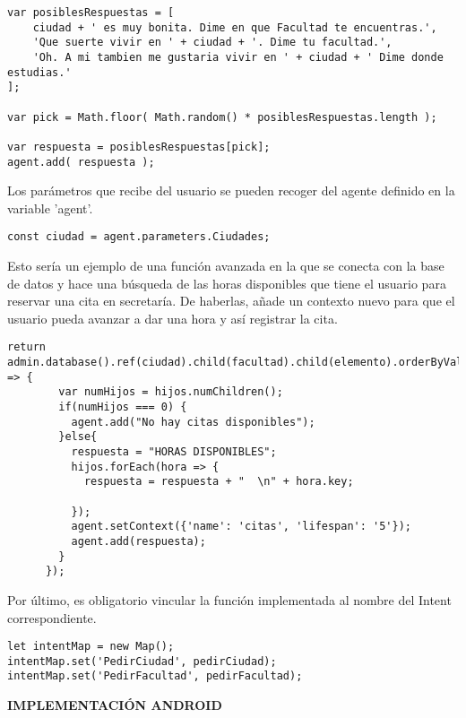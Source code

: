 \documentclass[11pt,a4paper]{article}
\begin{document}
\begin{lstlisting}
var posiblesRespuestas = [
    ciudad + ' es muy bonita. Dime en que Facultad te encuentras.',
    'Que suerte vivir en ' + ciudad + '. Dime tu facultad.',
    'Oh. A mi tambien me gustaria vivir en ' + ciudad + ' Dime donde estudias.'
];

var pick = Math.floor( Math.random() * posiblesRespuestas.length );

var respuesta = posiblesRespuestas[pick];
agent.add( respuesta );
\end{lstlisting}

Los parámetros que recibe del usuario se pueden recoger del agente definido en la variable 'agent'.\\

\begin{lstlisting}
const ciudad = agent.parameters.Ciudades;
\end{lstlisting}

Esto sería un ejemplo de una función avanzada en la que se conecta con la base de datos y hace una búsqueda de las horas disponibles que tiene el usuario para reservar una cita en secretaría. De haberlas, añade un contexto nuevo para que el usuario pueda avanzar a dar una hora y así registrar la cita.\\

\begin{lstlisting}
return admin.database().ref(ciudad).child(facultad).child(elemento).orderByValue().equalTo("LIBRE").once("value").then((hijos) => {
        var numHijos = hijos.numChildren();
        if(numHijos === 0) {
          agent.add("No hay citas disponibles");
        }else{
          respuesta = "HORAS DISPONIBLES";
          hijos.forEach(hora => {
            respuesta = respuesta + "  \n" + hora.key;

          });
          agent.setContext({'name': 'citas', 'lifespan': '5'});
          agent.add(respuesta);
        }
      });
\end{lstlisting}

Por último, es obligatorio vincular la función implementada al nombre del Intent correspondiente.\\

\begin{lstlisting}
let intentMap = new Map();
intentMap.set('PedirCiudad', pedirCiudad);
intentMap.set('PedirFacultad', pedirFacultad);
\end{lstlisting}


\newpage
\textbf{{\Large IMPLEMENTACIÓN ANDROID\\}}
\end{document}
